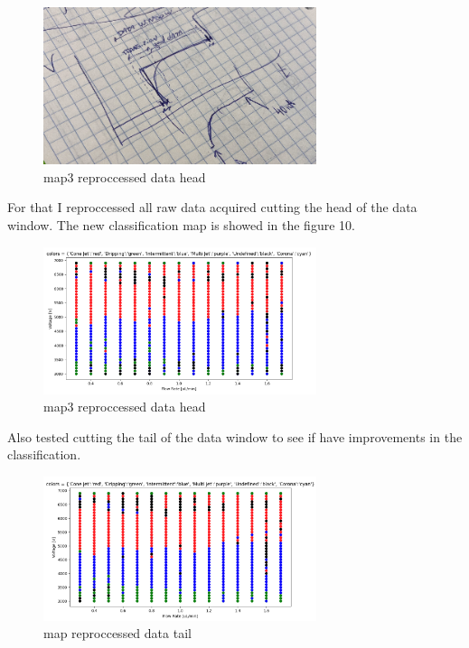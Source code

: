     \begin{multicols}{2}

        \begin{figure}[H]
            \center
            \includegraphics[width=8cm]{images/idea.png}
            \caption{ map3 reproccessed data head }
        \end{figure}


        For that I reproccessed all raw data acquired cutting the head of the data window. The new classification map is showed in the figure 10.

        \begin{figure}[H]
            \center
            \includegraphics[width=8cm]{images/map3_reproccessed_data_head.png}
            \caption{ map3 reproccessed data head }
        \end{figure}

        Also tested cutting the tail of the data window to see if have improvements in the classification.

        \begin{figure}[H]
            \center
            \includegraphics[width=8cm]{images/map3_reproccessed_data_tail.png}
            \caption{ map reproccessed data tail }
        \end{figure}



\end{multicols}

